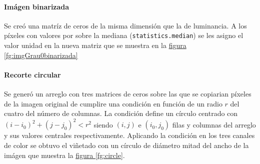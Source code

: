 \documentclass{article}
\begin{document}
\paragraph{Imágen binarizada}	
Se creó una matríz de ceros de la misma dimensión que la de luminancia.
A los píxeles con valores por sobre la mediana (\verb'statistics.median') se les asigno el valor unidad en la nueva matriz que se muestra en la \hyperref[fg:imgGrau0binarizada]{figura \ref*{fg:imgGrau0binarizada}}






\paragraph{Recorte circular}
Se generó un arreglo con tres matrices de ceros sobre las que se copiarian píxeles de la imagen original de cumplire una condición en función de un radio \(r\) del cuatro del número de columnas.
La condición define un círculo centrado con \((i- i_0)^2 + (j- j_0)^2 < r^2\) siendo \((i,j)\) e \((i_0, j_0)\) filas y columnas del arreglo y sus valores centrales respectivamente.
Aplicando la condición en los tres canales de color se obtuvo el viñetado con un círculo de diámetro mitad del ancho de la imágen que muestra la \hyperref[fg:circle]{figura \ref*{fg:circle}}. 
\end{document}
